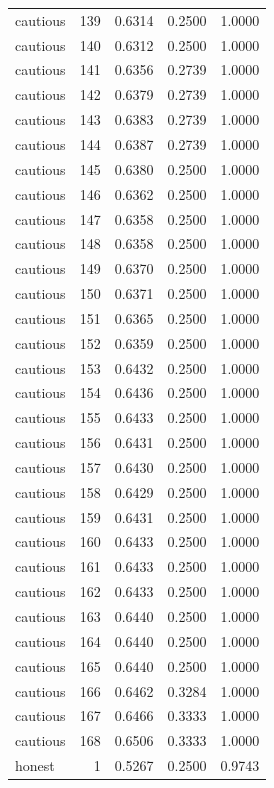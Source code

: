 \begin{tabular}{lrrrr}
cautious & 139 & 0.6314 & 0.2500 & 1.0000 \\
cautious & 140 & 0.6312 & 0.2500 & 1.0000 \\
cautious & 141 & 0.6356 & 0.2739 & 1.0000 \\
cautious & 142 & 0.6379 & 0.2739 & 1.0000 \\
cautious & 143 & 0.6383 & 0.2739 & 1.0000 \\
cautious & 144 & 0.6387 & 0.2739 & 1.0000 \\
cautious & 145 & 0.6380 & 0.2500 & 1.0000 \\
cautious & 146 & 0.6362 & 0.2500 & 1.0000 \\
cautious & 147 & 0.6358 & 0.2500 & 1.0000 \\
cautious & 148 & 0.6358 & 0.2500 & 1.0000 \\
cautious & 149 & 0.6370 & 0.2500 & 1.0000 \\
cautious & 150 & 0.6371 & 0.2500 & 1.0000 \\
cautious & 151 & 0.6365 & 0.2500 & 1.0000 \\
cautious & 152 & 0.6359 & 0.2500 & 1.0000 \\
cautious & 153 & 0.6432 & 0.2500 & 1.0000 \\
cautious & 154 & 0.6436 & 0.2500 & 1.0000 \\
cautious & 155 & 0.6433 & 0.2500 & 1.0000 \\
cautious & 156 & 0.6431 & 0.2500 & 1.0000 \\
cautious & 157 & 0.6430 & 0.2500 & 1.0000 \\
cautious & 158 & 0.6429 & 0.2500 & 1.0000 \\
cautious & 159 & 0.6431 & 0.2500 & 1.0000 \\
cautious & 160 & 0.6433 & 0.2500 & 1.0000 \\
cautious & 161 & 0.6433 & 0.2500 & 1.0000 \\
cautious & 162 & 0.6433 & 0.2500 & 1.0000 \\
cautious & 163 & 0.6440 & 0.2500 & 1.0000 \\
cautious & 164 & 0.6440 & 0.2500 & 1.0000 \\
cautious & 165 & 0.6440 & 0.2500 & 1.0000 \\
cautious & 166 & 0.6462 & 0.3284 & 1.0000 \\
cautious & 167 & 0.6466 & 0.3333 & 1.0000 \\
cautious & 168 & 0.6506 & 0.3333 & 1.0000 \\
honest & 1 & 0.5267 & 0.2500 & 0.9743 \\

\end{tabular}
